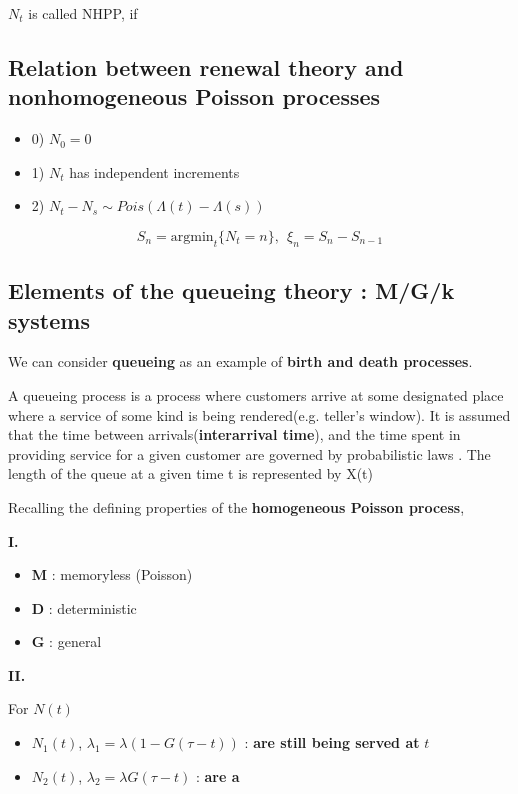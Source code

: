 \documentclass[12pt]{article}
\theoremstyle{nonumberbreak}
\begin{document}
$N_t$ is called NHPP, if 




\subsection{Relation between renewal theory and nonhomogeneous Poisson processes}


\begin{itemize}
	\item 0) $N_0 = 0$
	\item 1) $N_t$ has independent increments
	\item 2) $N_t - N_s \sim Pois(\Lambda(t) - \Lambda(s))$
\end{itemize}

$$
S_n = \mathrm{argmin}_t \{ N_t =n \}, \ \ \xi_n = S_n - S_{n-1}
$$





\subsection{Elements of the queueing theory : M/G/k systems}

We can consider \textbf{queueing} as an example of \textbf{birth and death processes}. 

A queueing process is a process where customers arrive at some designated place where a service of some kind is being rendered(e.g. teller's window). It is assumed that the time between arrivals(\textbf{interarrival time}), and the time spent in providing service for a given
customer are governed by probabilistic laws . The length of the queue at a
given time t is represented by X(t)


Recalling the defining properties of the \textbf{homogeneous Poisson process}, 

\textbf{I. }

\begin{itemize}
	\item \textbf{M} : memoryless (Poisson)
	\item \textbf{D} : deterministic
	\item \textbf{G} : general
\end{itemize}


\textbf{II. }


For $N(t)$

\begin{itemize}
	\item $N_1(t)$, $\lambda_1 = \lambda (1 - G(\tau - t) )$ : \textbf{are still being served at} $t$
	\item $N_2(t)$, $\lambda_2 = \lambda G(\tau - t)$ : \textbf{are a }
\end{itemize}
\end{document}
